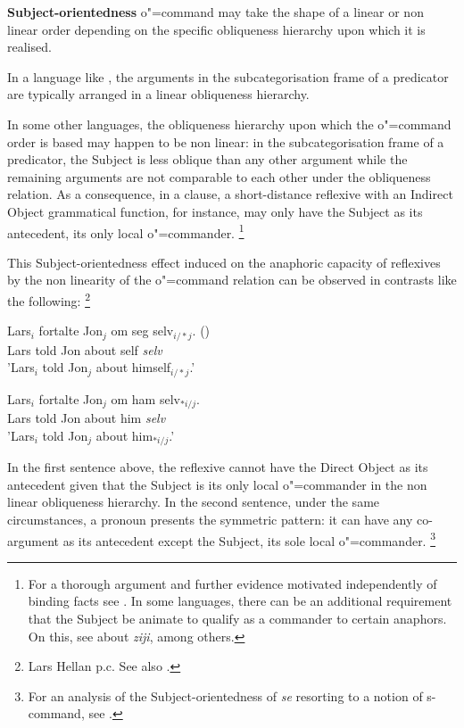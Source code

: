 \documentclass[output=paper
	        ,collection
	        ,collectionchapter
 	        ,biblatex
                ,babelshorthands
                ,newtxmath
                ,draftmode
                ,colorlinks, citecolor=brown
]{langscibook}
\begin{document}
\textbf{Subject-orientedness} o"=command may take the shape of a linear or non linear order
depending on the specific obliqueness hierarchy upon which it is 
realised.

In a language like , the arguments in the
subcategorisation frame of a predicator are typically arranged in a linear obliqueness
hierarchy.

In some other languages, the obliqueness hierarchy upon which the o"=command order
is based may happen to be non linear: in the subcategorisation frame of a
predicator, the Subject is less oblique than any other argument while the remaining arguments
are not comparable to each other under the obliqueness relation. As a consequence, in a clause,
a short-distance reflexive with an Indirect Object grammatical function, for instance, may only
have the Subject as its antecedent, its only local o"=commander.%
\footnote{For a thorough argument and further evidence motivated
independently of binding facts see \citep{branco:branch96, brancoMarrafa:subject97, branco:livro00}. In 
some languages, there can be an additional requirement that the Subject be
animate to qualify as a commander to certain anaphors. On this, 
see \citep{huangTang:longdistance91, xue:ziji94} about  {\em ziji}, among others.}
%

This Subject-orientedness effect induced on the anaphoric capacity of reflexives
by the non linearity of the o"=command relation can be observed in contrasts like
the following:%
\footnote{
Lars Hellan p.c. See also \citep[]{hellan:book88}.}

\begin{exe}
\ex
\begin{xlist}
\ex
\gll Lars$_{i}$ fortalte Jon$_{j}$ om seg selv$_{i/*j}$. ()
\\ 
Lars told Jon about self {\em selv} \\
\trans 'Lars$_{i}$ told Jon$_{j}$ about himself$_{i/*j}$.'

\ex
\gll Lars$_{i}$ fortalte Jon$_{j}$ om ham selv$_{*i/j}$.\\
Lars told Jon about him {\em selv}\\
\trans 'Lars$_{i}$ told Jon$_{j}$ about him$_{*i/j}$.'
\end{xlist}
\end{exe}


In the first sentence above, the reflexive cannot have the
Direct Object as its antecedent given that the Subject is its only
local  o"=commander in the non linear obliqueness hierarchy.
In the second sentence, under the same circumstances, a pronoun
presents the symmetric pattern: it can have any co-argument as
its antecedent except the Subject, its sole local o"=commander.%
%
\footnote{
For an analysis of the Subject-orientedness of  {\em se} resorting
to a notion of s-command, see \citep{abeille:depend98, abeille:composition98}.
}
\end{document}
